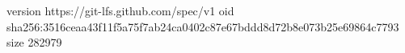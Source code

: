 version https://git-lfs.github.com/spec/v1
oid sha256:3516ceaa43f11f5a75f7ab24ca0402c87e67bddd8d72b8e073b25e69864c7793
size 282979
